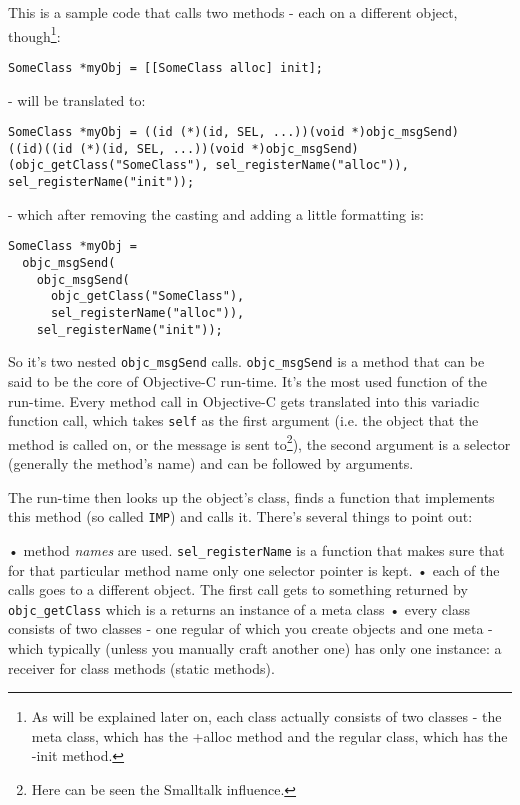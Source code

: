 \documentclass[a4paper, 11pt, fleqn]{book}
\begin{document}
This is a sample code that calls two methods - each on a different object, though\footnote{As will be explained later on, each class actually consists of two classes - the meta class, which has the +alloc method and the regular class, which has the -init method.}:
\begin{verbatim}SomeClass *myObj = [[SomeClass alloc] init];\end{verbatim}

- will be translated to:

\begin{verbatim}SomeClass *myObj = ((id (*)(id, SEL, ...))(void *)objc_msgSend)
((id)((id (*)(id, SEL, ...))(void *)objc_msgSend)
(objc_getClass("SomeClass"), sel_registerName("alloc")), 
sel_registerName("init"));\end{verbatim}

- which after removing the casting and adding a little formatting is:

\begin{verbatim}SomeClass *myObj = 
  objc_msgSend(
    objc_msgSend(
      objc_getClass("SomeClass"),  
      sel_registerName("alloc")), 
    sel_registerName("init"));
\end{verbatim}

So it's two nested \verb=objc_msgSend= calls. \verb=objc_msgSend= is a method that can be said to be the core of Objective-C run-time. It's the most used function of the run-time. Every method call in Objective-C gets translated into this variadic function call, which takes \verb=self= as the first argument (i.e. the object that the method is called on, or the message is sent to\footnote{Here can be seen the Smalltalk influence.}), the second argument is a selector (generally the method's name) and can be followed by arguments.

The run-time then looks up the object's class, finds a function that implements this method (so called \verb=IMP=) and calls it. There's several things to point out:

• method \emph{names} are used. \verb=sel_registerName= is a function that makes sure that for that particular method name only one selector pointer is kept.
• each of the calls goes to a different object. The first call gets to something returned by \verb=objc_getClass= which is a returns an instance of a meta class
• every class consists of two classes - one regular of which you create objects and one meta - which typically (unless you manually craft another one) has only one instance: a receiver for class methods (static methods).
\end{document}
